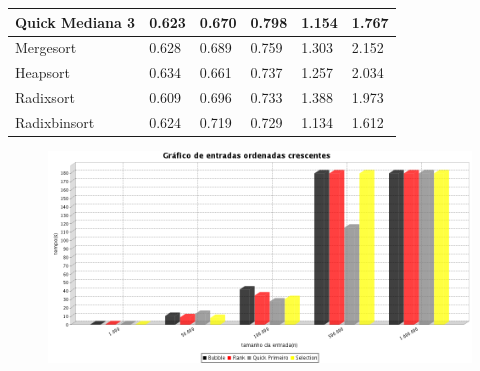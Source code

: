 \documentclass{article}
\begin{document}
\begin{flushleft}
\begin{itemize}
\begin{table}[ht]
\begin{tabular}{l|lllll|}
\multicolumn{1}{|l|}{Quick Mediana 3}     & 0.623          & 0.670           & 0.798            & 1.154            & 1.767              \\ \hline
\multicolumn{1}{|l|}{Mergesort}           & 0.628          & 0.689           & 0.759            & 1.303            & 2.152              \\ \hline
\multicolumn{1}{|l|}{Heapsort}            & 0.634          & 0.661           & 0.737            & 1.257            & 2.034              \\ \hline
\multicolumn{1}{|l|}{Radixsort}           & 0.609          & 0.696           & 0.733            & 1.388            & 1.973              \\ \hline
\multicolumn{1}{|l|}{Radixbinsort}        & 0.624          & 0.719           & 0.729            & 1.134            & 1.612              \\ \hline
\end{tabular}
\end{table}

\begin{figure}[!htb]	
   	\includegraphics[width=18cm]{grafico1.png}
\end{figure}

\newpage


\end{itemize}
\end{flushleft}
\end{document}
